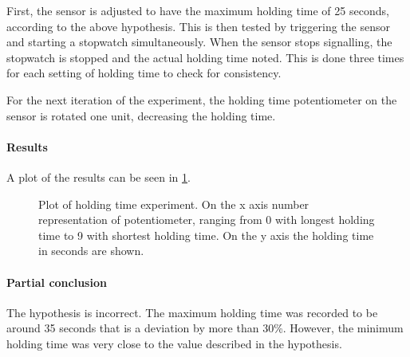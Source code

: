 First, the sensor is adjusted to have the maximum holding time of 25 seconds,
according to the above hypothesis. This is then tested by triggering the sensor
and starting a stopwatch simultaneously. When the sensor stops signalling, the
stopwatch is stopped and the actual holding time noted. This is done three times
for each setting of holding time to check for consistency.

For the next iteration of the experiment, the holding time potentiometer on the sensor
is rotated one unit, decreasing the holding time.

\paragraph{Results}

A plot of the results can be seen in \cref{fig:pir_delay}.

\begin{figure}[htbp]
\centering
{}
\caption[Holding experiment]{Plot of holding time experiment. On the x axis number representation of potentiometer, ranging from 0 with longest holding time to 9 with shortest holding time. On the y axis the holding time in seconds are shown.}\label{fig:pir_delay}
\end{figure}

\paragraph{Partial conclusion}

The hypothesis is incorrect. The maximum holding time was recorded to be around 35 seconds that is a deviation by more than 30\%.
However, the minimum holding time was very close to the value described in the hypothesis.
